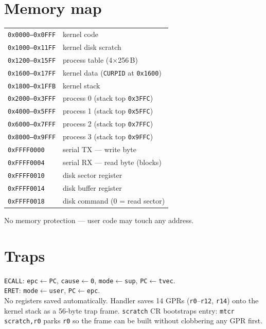 \documentclass[9pt]{extarticle}
\newcommand{\code}[1]{\texttt{#1}}
\begin{document}
\begin{multicols}{2}
\section{Memory map}
\begin{tabular}{@{}L{3.0cm} L{3.6cm}@{}}
\code{0x0000--0x0FFF} & kernel code \\
\code{0x1000--0x11FF} & kernel disk scratch \\
\code{0x1200--0x15FF} & process table (4$\times$256\,B) \\
\code{0x1600--0x17FF} & kernel data (\code{CURPID} at \code{0x1600}) \\
\code{0x1800--0x1FFB} & kernel stack \\
\code{0x2000--0x3FFF} & process 0 (stack top \code{0x3FFC}) \\
\code{0x4000--0x5FFF} & process 1 (stack top \code{0x5FFC}) \\
\code{0x6000--0x7FFF} & process 2 (stack top \code{0x7FFC}) \\
\code{0x8000--0x9FFF} & process 3 (stack top \code{0x9FFC}) \\
\code{0xFFFF0000}     & serial TX --- write byte \\
\code{0xFFFF0004}     & serial RX --- read byte (blocks) \\
\code{0xFFFF0010}     & disk sector register \\
\code{0xFFFF0014}     & disk buffer register \\
\code{0xFFFF0018}     & disk command (0 = read sector) \\
\end{tabular}
\par\vspace{0.2em}\noindent
{\footnotesize No memory protection --- user code may touch any address.}

\section{Traps}
\code{ECALL}: \code{epc$\leftarrow$PC}, \code{cause$\leftarrow$0},
\code{mode$\leftarrow$sup}, \code{PC$\leftarrow$tvec}. \\
\code{ERET}: \code{mode$\leftarrow$user}, \code{PC$\leftarrow$epc}. \\
{\footnotesize No registers saved automatically. Handler saves 14 GPRs
(\code{r0}--\code{r12}, \code{r14}) onto the kernel stack as a 56-byte trap
frame. \code{scratch} CR bootstraps entry: \code{mtcr scratch,r0} parks
\code{r0} so the frame can be built without clobbering any GPR first.}


\end{multicols}
\end{document}
